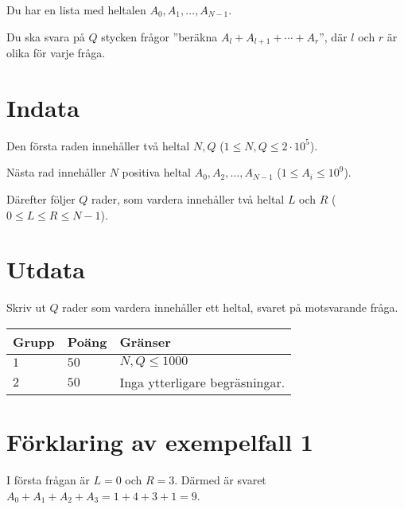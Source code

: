 Du har en lista med heltalen $A_0, A_1, \dots, A_{N-1}$.

Du ska svara på $Q$ stycken frågor ”beräkna $A_l+A_{l+1}+\cdots+A_{r}$”, där $l$ och $r$ är olika
för varje fråga. 

\section*{Indata}
Den första raden innehåller två heltal $N, Q$ ($1 \leq N, Q \leq 2 \cdot 10^5$).

Nästa rad innehåller $N$ positiva heltal $A_0, A_2, \dots, A_{N-1}$ ($1 \leq A_i \leq 10^9$).

Därefter följer $Q$ rader, som vardera innehåller två heltal $L$ och $R$ ($0 \leq L \leq R \leq N-1$).

\section*{Utdata}
Skriv ut $Q$ rader som vardera innehåller ett heltal, svaret på motsvarande fråga.


\noindent
\begin{tabular}{| l | l | p{12cm} |}
  \hline
  \textbf{Grupp} & \textbf{Poäng} & \textbf{Gränser} \\ \hline
  $1$    & $50$      & $N, Q \leq 1000$ \\ \hline
  $2$    & $50$      & Inga ytterligare begräsningar. \\ \hline
\end{tabular}

\section*{Förklaring av exempelfall 1}
I första frågan är $L=0$ och $R=3$. Därmed är svaret $A_0+A_1+A_2+A_3=1+4+3+1=9$.
